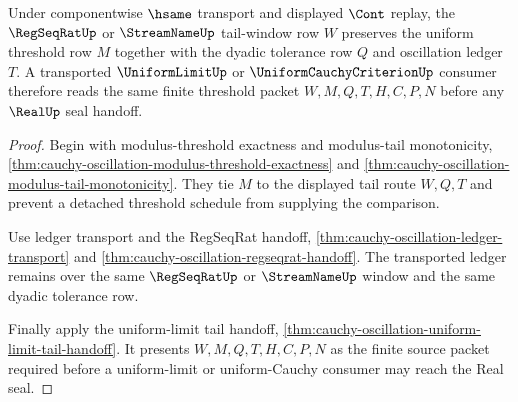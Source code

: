 \begin{theorem}
\label{thm:cauchy-oscillation-regseqrat-uniform-threshold}
Under componentwise $\hsame$ transport and displayed $\Cont$ replay, the $\RegSeqRatUp$ or $\StreamNameUp$ tail-window row $W$ preserves the uniform threshold row $M$ together with the dyadic tolerance row $Q$ and oscillation ledger $T$. A transported $\UniformLimitUp$ or $\UniformCauchyCriterionUp$ consumer therefore reads the same finite threshold packet $W,M,Q,T,H,C,P,N$ before any $\RealUp$ seal handoff.
\end{theorem}
\begin{proof}
Begin with modulus-threshold exactness and modulus-tail monotonicity, \autoref{thm:cauchy-oscillation-modulus-threshold-exactness} and \autoref{thm:cauchy-oscillation-modulus-tail-monotonicity}. They tie $M$ to the displayed tail route $W,Q,T$ and prevent a detached threshold schedule from supplying the comparison.

Use ledger transport and the RegSeqRat handoff, \autoref{thm:cauchy-oscillation-ledger-transport} and \autoref{thm:cauchy-oscillation-regseqrat-handoff}. The transported ledger remains over the same $\RegSeqRatUp$ or $\StreamNameUp$ window and the same dyadic tolerance row.

Finally apply the uniform-limit tail handoff, \autoref{thm:cauchy-oscillation-uniform-limit-tail-handoff}. It presents $W,M,Q,T,H,C,P,N$ as the finite source packet required before a uniform-limit or uniform-Cauchy consumer may reach the Real seal.
\end{proof}

